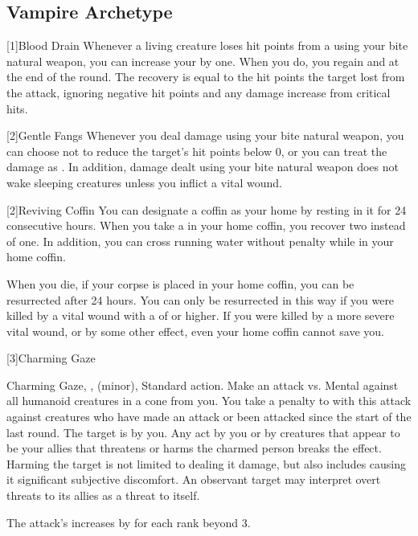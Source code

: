  \subsection{Vampire Archetype}

    [1]{Blood Drain} Whenever a living creature loses hit points from a  using your bite natural weapon, you can increase your  by one.
      When you do, you regain  and  at the end of the round.
      The recovery is equal to the hit points the target lost from the attack, ignoring negative hit points and any damage increase from critical hits.

    [2]{Gentle Fangs} Whenever you deal damage using your bite natural weapon, you can choose not to reduce the target's hit points below 0, or you can treat the damage as .
      In addition, damage dealt using your bite natural weapon does not wake sleeping creatures unless you inflict a vital wound.

      [2]{Reviving Coffin} You can designate a coffin as your home by resting in it for 24 consecutive hours.
      When you take a  in your home coffin, you recover two  instead of one.
      In addition, you can cross running water without penalty while in your home coffin.

      When you die, if your corpse is placed in your home coffin, you can be resurrected after 24 hours.
      You can only be resurrected in this way if you were killed by a vital wound with a  of  or higher.
      If you were killed by a more severe vital wound, or by some other effect, even your home coffin cannot save you.

      [3]{Charming Gaze}
      \begin{magicalsustainability}{Charming Gaze}{, ,  (minor), }
        \abilityusagetime Standard action.
        \rankline
        Make an attack vs. Mental against all humanoid creatures in a \largearea cone from you.
        You take a  penalty to  with this attack against creatures who have made an attack or been attacked since the start of the last round.
        \hit The target is \charmed by you.
        Any act by you or by creatures that appear to be your allies that threatens or harms the charmed person breaks the effect.
        Harming the target is not limited to dealing it damage, but also includes causing it significant subjective discomfort.
        An observant target may interpret overt threats to its allies as a threat to itself.

        \rankline
        The attack's  increases by  for each rank beyond 3.
      \end{magicalsustainability}

